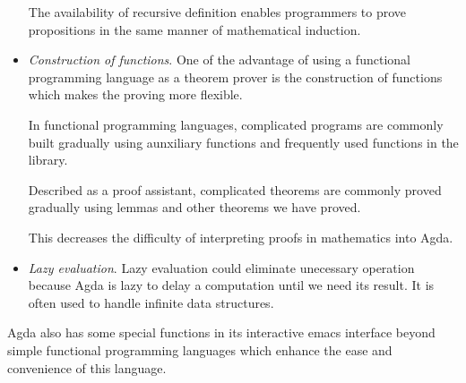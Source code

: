 \begin{itemize}
The availability of recursive definition enables programmers to prove propositions in the same manner of mathematical induction. 

\item \textit{Construction of functions}. One of the advantage of using a functional programming language as a theorem prover is the construction of functions which makes the proving more flexible.

In functional programming languages, complicated programs are commonly built gradually using aunxiliary functions and frequently used functions in the library.

Described as a proof assistant, complicated theorems are commonly proved gradually using lemmas and other theorems we have proved.

This decreases the difficulty of interpreting proofs in mathematics into Agda.

\item \textit{Lazy evaluation}. Lazy evaluation could eliminate unecessary operation because Agda is lazy to delay a computation until we need its result. It is often used to handle infinite data structures. \cite{wiki:Lazy_evaluation}

\end{itemize}

Agda also has some special functions in its interactive emacs interface beyond simple functional programming languages which enhance the ease and convenience of this language.

